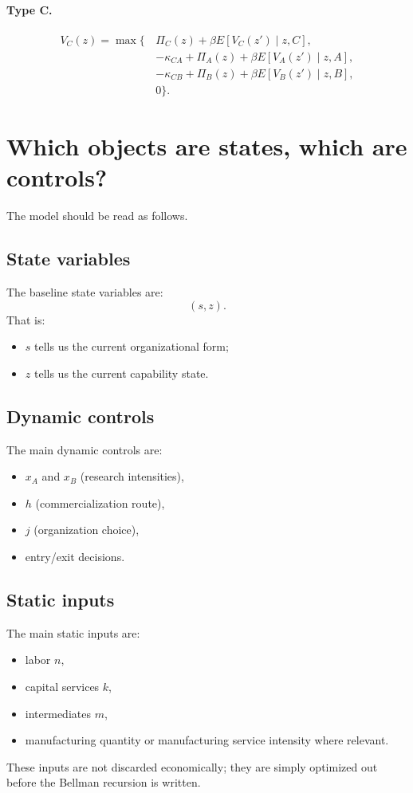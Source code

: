 \documentclass[12pt,fontset=none]{ctexart}
\begin{document}
\paragraph{Type C.}
\[
\begin{aligned}
V_C(z)=\max\bigl\{\,&\Pi_C(z)+\beta E[V_C(z')\mid z,C],\\
&-\kappa_{CA}+\Pi_A(z)+\beta E[V_A(z')\mid z,A],\\
&-\kappa_{CB}+\Pi_B(z)+\beta E[V_B(z')\mid z,B],\\
&0\bigr\}.
\end{aligned}
\]

\section{Which objects are states, which are controls?}

The model should be read as follows.

\subsection{State variables}

The baseline state variables are:
\[
(s,z).
\]
That is:
\begin{itemize}[leftmargin=2em]
    \item $s$ tells us the current organizational form;
    \item $z$ tells us the current capability state.
\end{itemize}

\subsection{Dynamic controls}

The main dynamic controls are:
\begin{itemize}[leftmargin=2em]
    \item $x_A$ and $x_B$ (research intensities),
    \item $h$ (commercialization route),
    \item $j$ (organization choice),
    \item entry/exit decisions.
\end{itemize}

\subsection{Static inputs}

The main static inputs are:
\begin{itemize}[leftmargin=2em]
    \item labor $n$,
    \item capital services $k$,
    \item intermediates $m$,
    \item manufacturing quantity or manufacturing service intensity where relevant.
\end{itemize}
These inputs are not discarded economically; they are simply optimized out before the
Bellman recursion is written.
\end{document}
